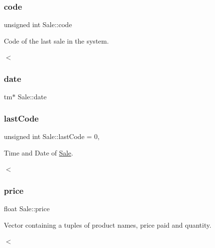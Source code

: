 \subsubsection{\texorpdfstring{code}{code}}
{\footnotesize\ttfamily unsigned int Sale\+::code\hspace{0.3cm}{\ttfamily [private]}}



Code of the last sale in the system. 

$<$ \mbox{\label{classSale_a953e40805ef7b401caa1fc356c23772c}} 
\subsubsection{\texorpdfstring{date}{date}}
{\footnotesize\ttfamily tm$\ast$ Sale\+::date\hspace{0.3cm}{\ttfamily [private]}}

\mbox{\label{classSale_aeebd444e8f864bd91a90e6d426dabc70}} 
\subsubsection{\texorpdfstring{last\+Code}{lastCode}}
{\footnotesize\ttfamily unsigned int Sale\+::last\+Code = 0\hspace{0.3cm}{\ttfamily [static]}, {\ttfamily [private]}}



Time and Date of \hyperlink{classSale}{Sale}. 

$<$ \mbox{\label{classSale_a7fcb726755f9a802c21c1ecef5fc5753}} 
\subsubsection{\texorpdfstring{price}{price}}
{\footnotesize\ttfamily float Sale\+::price\hspace{0.3cm}{\ttfamily [private]}}



Vector containing a tuples of product names, price paid and quantity. 

$<$ \mbox{\label{classSale_a968a0a80a79f28b918509af6f9c93821}} 
